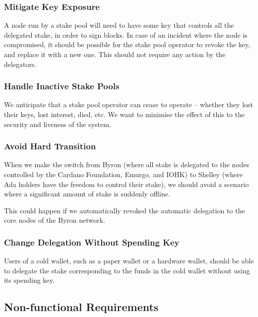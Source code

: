 \documentclass[11pt,a4paper]{article}
\begin{document}
\subsubsection{Mitigate Key Exposure}\label{mitigate-key-exposure}

A node run by a stake pool will need to have some key that controls all
the delegated stake, in order to sign blocks. In case of an incident
where the node is compromised, it should be possible for the stake pool
operator to revoke the key, and replace it with a new one. This should
not require any action by the delegators.

\subsubsection{Handle Inactive Stake
Pools}\label{handle-inactive-stake-pools}

We anticipate that a stake pool operator can cease to operate -- whether
they lost their keys, lost interest, died, etc. We want to minimise the
effect of this to the security and liveness of the system.

\subsubsection{Avoid Hard Transition}\label{avoid-hard-transition}

When we make the switch from Byron (where all stake is delegated to the
nodes controlled by the Cardano Foundation, Emurgo, and IOHK) to Shelley
(where Ada holders have the freedom to control their stake), we should
avoid a scenario where a significant amount of stake is suddenly
offline.

This could happen if we automatically revoked the automatic delegation
to the core nodes of the Byron network.

\subsubsection{Change Delegation Without Spending
Key}\label{change-delegation-without-spending-key}

Users of a cold wallet, such as a paper wallet or a hardware wallet,
should be able to delegate the stake corresponding to the funds in the
cold wallet without using its spending key.

\subsection{Non-functional
Requirements}\label{non-functional-requirements}
\end{document}
